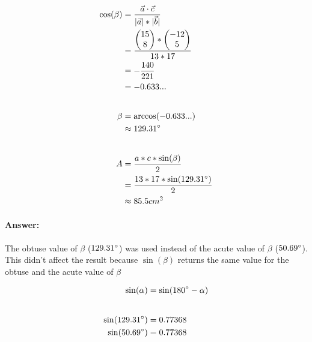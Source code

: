 \begin{align}
    \cos({\beta}) &= \frac{\vec{a} \cdot \vec{c}}{|\vec{a}| * |\vec{b}|} \\
    &= \frac{\begin{pmatrix} 15 \\ 8 \\ \end{pmatrix} * \begin{pmatrix} -12 \\ 5 \\ \end{pmatrix}}{13 * 17}  \\
    &= -\frac{140}{221} \\
    &= -0.633... \\[20pt]
    \beta &= \arccos(-0.633...) \\
    &\approx 129.31^\circ \\[20pt]
    A &= \frac{a * c * \sin({\beta})}{2} \\
    &= \frac{13 * 17 * \sin({129.31^\circ})}{2} \\
    &\approx 85.5cm^2
\end{align}

\pagebreak

\paragraph{Answer:}
The obtuse value of $\beta$ ($129.31^\circ$) was used instead of the acute value of $\beta$ 
($\cosanginv^\circ$). This didn't affect the result because 
$\sin(\beta)$ returns the same value for the obtuse and the acute value of $\beta$


\begin{align}
    \sin(\alpha) &= \sin(180^\circ - \alpha) \\[20pt]
    \sin(\cosang^\circ) &= \sinofang \\
    \sin(\cosanginv^\circ) &= \sinofanginv 
\end{align}
